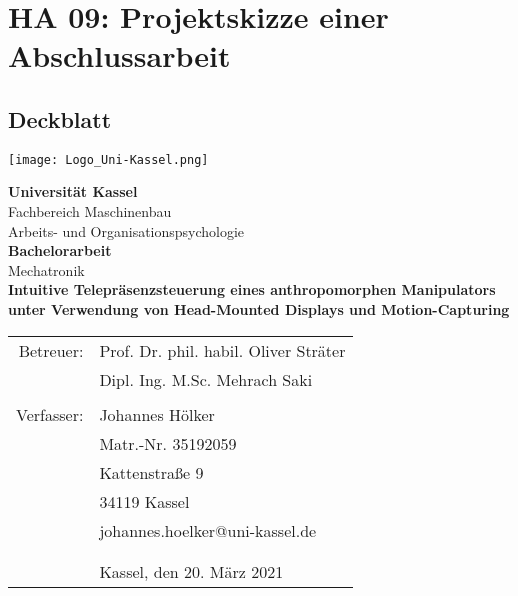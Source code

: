 \section{HA 09: Projektskizze einer Abschlussarbeit}
\subsection{Deckblatt}
\texttt{[image: Logo\_Uni-Kassel.png]}\vspace{50pt}
\begin{center}
\textbf{Universität Kassel}\\
Fachbereich Maschinenbau\\
Arbeits- und Organisationspsychologie\\\vspace{50pt}
\textbf{Bachelorarbeit}\\
Mechatronik\\\vspace{20pt}
\textbf{Intuitive Telepräsenzsteuerung eines anthropomorphen Manipulators unter Verwendung von Head-Mounted Displays und Motion-Capturing}\\\vspace{30pt}
\begin{tabular}{rl}
Betreuer: & Prof. Dr. phil. habil. Oliver Sträter\\
 & Dipl. Ing. M.Sc. Mehrach Saki \\
  & \\
Verfasser: & Johannes Hölker\\
 & Matr.-Nr. 35192059\\
 & Kattenstraße 9\\
 & 34119 Kassel\\
 & johannes.hoelker@uni-kassel.de\\\vspace{40pt}
 & \\
 & \\
 & Kassel, den 20. März 2021\\
\end{tabular}
\end{center}
